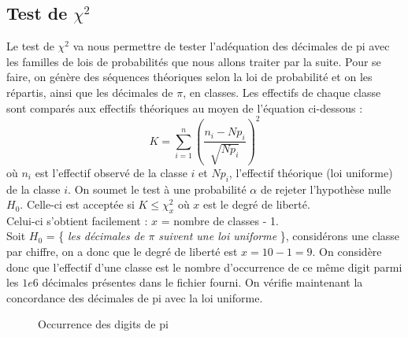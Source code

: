 \documentclass[10pt,a4paper]{article}
\begin{document}
\subsection{Test de $\chi^2$}
Le test de $\chi^2$ va nous permettre de tester l'adéquation des décimales de pi avec les familles de lois de probabilités que nous allons traiter par la suite. Pour se faire, on génère des séquences théoriques selon la loi de probabilité et on les répartis, ainsi que les décimales de $\pi$, en classes. Les effectifs de chaque classe sont comparés aux effectifs théoriques au moyen de l'équation ci-dessous :
\[ K = \displaystyle\sum_{i=1}^n (\frac{n_i-Np_i}{\sqrt{Np_i}})^2\]
où $n_i$ est l'effectif observé de la classe $i$ et $Np_i$, l'effectif théorique (loi uniforme) de la classe $i$. On soumet le test à une probabilité $\alpha$ de rejeter l'hypothèse nulle $H_0$. Celle-ci est acceptée si $K \leq \chi_x^2$ où $x$ est le degré de liberté. \\Celui-ci s'obtient facilement : $x$ = nombre de classes - 1. \\

Soit $H_0$ = \{\textit{ les décimales de $\pi$ suivent une loi uniforme }\}, considérons une classe par chiffre, on a donc que le degré de liberté est $x = 10 - 1 = 9 $. On considère donc que l'effectif d'une classe est le nombre d'occurrence de ce même digit parmi les $1e6$ décimales présentes dans le fichier fourni. On vérifie maintenant la concordance des décimales de pi avec la loi uniforme.
\begin{figure}[h!]
\caption{Occurrence des digits de pi}
\label{khi2histo}
\end{figure}
\end{document}
